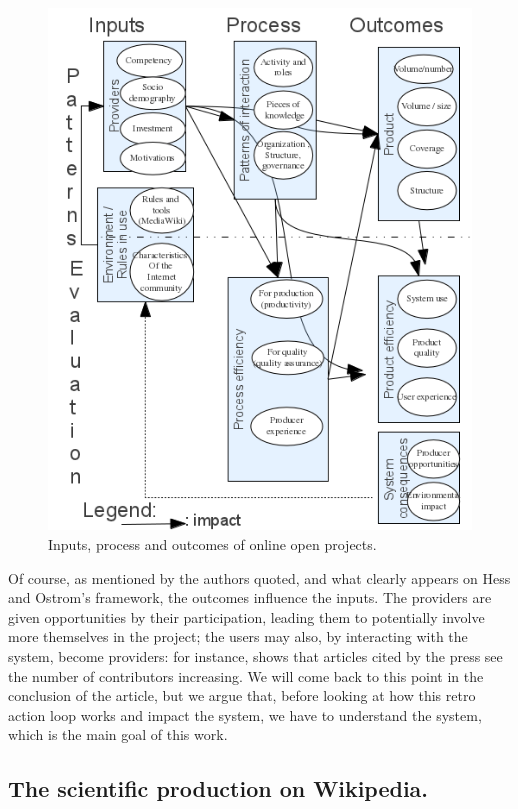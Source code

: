 \begin{figure}
\caption{\label{fig:Input,-process-and}{Inputs,
process and outcomes of online open projects.}}
\includegraphics{New_model_of_group_processes_in_open_content_communities}
\end{figure}

Of course, as mentioned by the authors quoted, and what clearly appears
on Hess and Ostrom's framework, the outcomes influence the inputs.
The providers are given opportunities by their participation, leading
them to potentially involve more themselves in the project; the users
may also, by interacting with the system, become providers: for instance,
\citet{Lih04} shows that articles cited by the press see the number
of contributors increasing. We will come back to this point in the
conclusion of the article, but we argue that, before looking at how
this retro action loop works and impact the system, we have to understand
the system, which is the main goal of this work.

\subsection{The scientific production on Wikipedia.}

